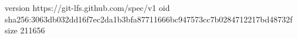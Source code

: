 version https://git-lfs.github.com/spec/v1
oid sha256:3063db032dd16f7ec2da1b3bfa87711666bc947573cc7b0284712217bd48732f
size 211656
